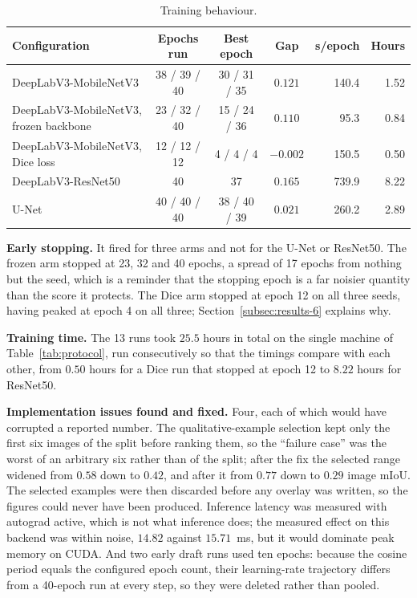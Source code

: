 \begin{table}[H]
\centering
\caption{Training behaviour.}
\label{tab:behaviour}
\small
\begin{tabular}{lcccrr}
\hline
\textbf{Configuration} & \textbf{Epochs run} & \textbf{Best epoch} & \textbf{Gap} & \textbf{s/epoch} & \textbf{Hours} \\
\hline
DeepLabV3-MobileNetV3                  & 38 / 39 / 40 & 30 / 31 / 35 & $0.121$  & 140.4 & 1.52 \\
DeepLabV3-MobileNetV3, frozen backbone & 23 / 32 / 40 & 15 / 24 / 36 & $0.110$  &  95.3 & 0.84 \\
DeepLabV3-MobileNetV3, Dice loss       & 12 / 12 / 12 &  4 /  4 /  4 & $-0.002$ & 150.5 & 0.50 \\
DeepLabV3-ResNet50                     & 40           & 37           & $0.165$  & 739.9 & 8.22 \\
U-Net                                  & 40 / 40 / 40 & 38 / 40 / 39 & $0.021$  & 260.2 & 2.89 \\
\hline
\end{tabular}
\end{table}

\textbf{Early stopping.} It fired for three arms and not for the U-Net or ResNet50. The frozen
arm stopped at 23, 32 and 40 epochs, a spread of 17 epochs from nothing but the seed, which is a
reminder that the stopping epoch is a far noisier quantity than the score it protects. The Dice
arm stopped at epoch 12 on all three seeds, having peaked at epoch 4 on all three;
Section~\ref{subsec:results-6} explains why.

\textbf{Training time.} The 13 runs took $25.5$ hours in total on the single machine of
Table~\ref{tab:protocol}, run consecutively so that the timings compare with each other, from
$0.50$ hours for a Dice run that stopped at epoch 12 to $8.22$ hours for ResNet50.

\textbf{Implementation issues found and fixed.} Four, each of which would have corrupted a
reported number. The qualitative-example selection kept only the first six images of the split
before ranking them, so the ``failure case'' was the worst of an arbitrary six rather than of the
split; after the fix the selected range widened from $0.58$ down to $0.42$, and after it from $0.77$ down to $0.29$ image mIoU.
The selected examples were then discarded before any overlay was written, so the figures could
never have been produced. Inference latency was measured with autograd active, which is not what
inference does; the measured effect on this backend was within noise, $14.82$ against
$15.71$~ms, but it would dominate peak memory on CUDA. And two early draft runs used ten epochs:
because the cosine period equals the configured epoch count, their learning-rate trajectory
differs from a 40-epoch run at every step, so they were deleted rather than pooled.

